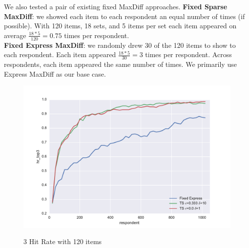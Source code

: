 \documentclass[mksc,blindrev]{informs3} %
\begin{document}
We also tested a pair of existing fixed MaxDiff approaches.
\textbf{Fixed Sparse MaxDiff}: we showed each item to each respondent an equal number of times (if possible).  With 120 items, 18 sets, and 5 items per set each item appeared on average $\frac{18*5}{120} = 0.75$ times per respondent. \\
\textbf{Fixed Express MaxDiff}: we randomly drew 30 of the 120 items to show to each respondent.  Each item appeared $\frac{18*5}{30} = 3$ times per respondent.  Across respondents, each item appeared the same number of times. We primarily use Express MaxDiff as our base case.\\
\begin{figure}
\caption{3 Hit Rate with 120 items}
\includegraphics[width=1\textwidth]{plots/3hitrate120show3.pdf}
\label{fig:3hit}
\end{figure}
\end{document}
